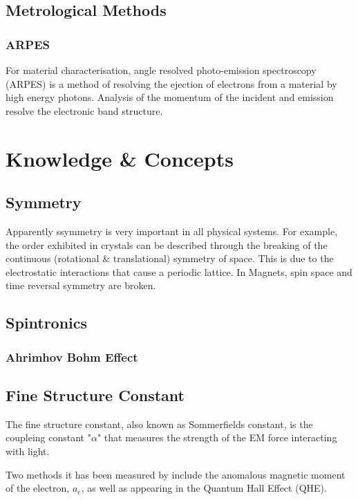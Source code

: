\documentclass{article} %
\begin{document}
\subsection{Metrological Methods}
\subsubsection{ARPES}
For material characterisation, angle resolved photo-emission spectroscopy (ARPES) is a method of resolving the ejection of electrons from a material by high energy photons. Analysis of the momentum of the incident and emission resolve the electronic band structure. 




\section{}


\section{Knowledge \& Concepts}
\subsection{Symmetry}
Apparently ssymmetry is very important in all physical systems. 
For example, the order exhibited in crystals can be described through the breaking of the continuous (rotational \& translational) symmetry of space. This is due to the electrostatic interactions that cause a periodic lattice. In Magnets, spin space and time reversal symmetry are broken.
%


\subsection{Spintronics}
\subsubsection{Ahrimhov Bohm Effect}

\subsection{Fine Structure Constant}
The fine structure constant, also known as Sommerfields constant, is the coupleing constant "$\alpha$" that measures the strength of the EM force interacting with light.

Two methods it has been measured by include the anomalous magnetic moment of the electron, $a_e$, as well as appearing in the Quantum Hall Effect (QHE). 
\end{document}
